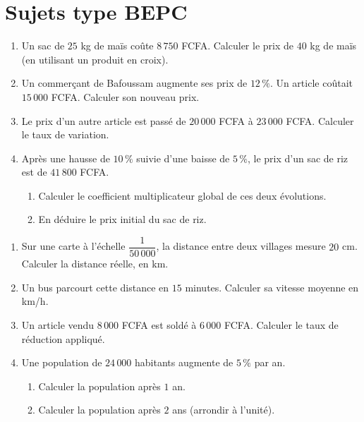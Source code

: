 \section{Sujets type BEPC}

\begin{enumerate}[label=\arabic*)]
\item Un sac de $25$ kg de maïs coûte $8\,750$ FCFA. Calculer le prix de $40$ kg de maïs
(en utilisant un produit en croix).
\item Un commerçant de Bafoussam augmente ses prix de $12\,\%$. Un article coûtait
$15\,000$ FCFA. Calculer son nouveau prix.
\item Le prix d'un autre article est passé de $20\,000$ FCFA à $23\,000$ FCFA. Calculer le
taux de variation.
\item Après une hausse de $10\,\%$ suivie d'une baisse de $5\,\%$, le prix d'un sac de riz
est de $41\,800$ FCFA.
\begin{enumerate}[label=\alph*)]
\item Calculer le coefficient multiplicateur global de ces deux évolutions.
\item En déduire le prix initial du sac de riz.
\end{enumerate}
\end{enumerate}

\begin{enumerate}[label=\arabic*)]
\item Sur une carte à l'échelle $\dfrac1{50\,000}$, la distance entre deux villages mesure
$20$ cm. Calculer la distance réelle, en km.
\item Un bus parcourt cette distance en $15$ minutes. Calculer sa vitesse moyenne en km/h.
\item Un article vendu $8\,000$ FCFA est soldé à $6\,000$ FCFA. Calculer le taux de
réduction appliqué.
\item Une population de $24\,000$ habitants augmente de $5\,\%$ par an.
\begin{enumerate}[label=\alph*)]
\item Calculer la population après $1$ an.
\item Calculer la population après $2$ ans (arrondir à l'unité).
\end{enumerate}
\end{enumerate}


